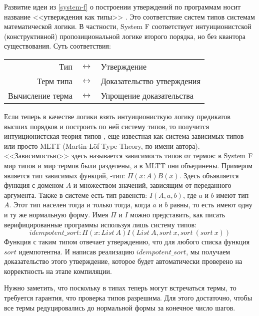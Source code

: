Развитие идеи из \ref{system-f} о построении утверждений по программам носит
название <<утверждения как типы>> \cite{propositions-as-types}. Это соответствие
систем типов системам математической логики. В частности, System F
соответствует интуиционистской (конструктивной) пропозициональной логике второго
порядка, но без квантора существования. Суть соответствия:

\begin{tabular}{rcl}
  Тип & \(\leftrightarrow\) & Утверждение\\
  Терм типа & \(\leftrightarrow\) & Доказательство утверждения\\
  Вычисление терма & \(\leftrightarrow\) & Упрощение доказательства
\end{tabular}

Если теперь в качестве логики взять интуиционисткую логику предикатов высших
порядков и построить по ней систему типов, то получится интуиционистская
теория типов \cite{intuitionistic-theory-of-types}, еще известная как система
зависимых типов  или просто MLTT (Martin-L\"of Type Theory, по имени автора).
<<Зависимостью>> здесь называется зависимость типов от термов:
в System F мир типов и мир термов были разделены, а в MLTT они объединены.
Примером является тип зависимых функций, \textPi-тип: \(\Pi(x : A)B(x)\).
Здесь объявляется функция с доменом \(A\) и множеством значений, зависящим от
переданного аргумента. Также в системе есть тип равенств: \(I(A, a, b)\), где \(a\) и
\(b\) имеют тип \(A\). Этот тип населен тогда и только тогда, когда \(a\) и \(b\)
равны, то есть имеют одну и ту же нормальную форму. Имея \(\Pi\) и \(I\) можно
представить, как писать верифицированные программы используя лишь систему типов:
\[
  idempotent\_sort : \Pi(x : List\ A) I(List\ A, sort\ x, sort\ (sort\ x))
\]
Функция с таким типом отвечает утверждению, что для любого списка функция \(sort\)
идемпотентна. И написав реализацию \(idempotent\_sort\), мы получаем доказательство
этого утверждение, которое будет автоматически проверено на корректность на этапе
компиляции.

Нужно заметить, что поскольку в типах теперь могут встречаться термы, то требуется
гарантия, что проверка типов разрешима. Для этого достаточно, чтобы все термы
редуцировались до нормальной формы за конечное число шагов.

